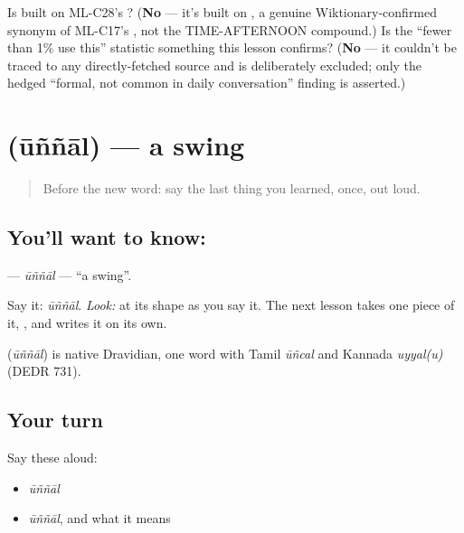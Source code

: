 \begin{tcolorbox}[breakable,colback=teal!4,colframe=teal!35!black,title={Before you move on}]
Is   built on ML-C28's ? (\textbf{No} — it's built on , a genuine Wiktionary-confirmed synonym of ML-C17's , not the TIME-AFTERNOON compound.) Is the \textquotedblleft{}fewer than 1\% use this\textquotedblright{} statistic something this lesson confirms? (\textbf{No} — it couldn't be traced to any directly-fetched source and is deliberately excluded; only the hedged \textquotedblleft{}formal, not common in daily conversation\textquotedblright{} finding is asserted.)
\end{tcolorbox}
\section[\texorpdfstring{\ml{ഊഞ്ഞാൽ} (ūññāl)}{ഊഞ്ഞാൽ (ūññāl)}]{ (ūññāl) — a swing}

\label{lesson:ML-C31-oonjaal}



\begin{quote}
Before the new word: say the last thing you learned, once, out loud.
\end{quote}

\subsection*{You'll want to know: }
\textbf{} — \emph{ūññāl} — \textquotedblleft{}a swing\textquotedblright{}.

Say it: \emph{ūññāl}. \emph{Look:} at its shape as you say it. The next lesson takes one piece of it, \textbf{}, and writes it on its own.

\begin{cousinweb}
\textbf{} (\emph{ūññāl}) is native Dravidian, one word with Tamil \emph{ūñcal} and Kannada \emph{uyyal(u)} (DEDR 731).
\end{cousinweb}

\subsection*{Your turn}
Say these aloud:

\begin{itemize}
\raggedright
  \item \emph{ūññāl}
  \item \emph{ūññāl}, and what it means
\end{itemize}

